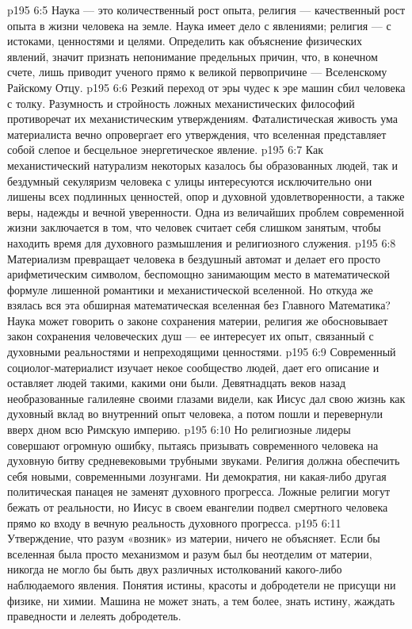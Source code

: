 \vs p195 6:5 Наука --- это количественный рост опыта, религия --- качественный рост опыта в жизни человека на земле. Наука имеет дело с явлениями; религия --- с истоками, ценностями и целями. Определить  как объяснение физических явлений, значит признать непонимание предельных причин, что, в конечном счете, лишь приводит ученого прямо к великой первопричине --- Вселенскому Райскому Отцу.
\vs p195 6:6 Резкий переход от эры чудес к эре машин сбил человека с толку. Разумность и стройность ложных механистических философий противоречат их механистическим утверждениям. Фаталистическая живость ума материалиста вечно опровергает его утверждения, что вселенная представляет собой слепое и бесцельное энергетическое явление.
\vs p195 6:7 Как механистический натурализм некоторых казалось бы образованных людей, так и бездумный секуляризм человека с улицы интересуются исключительно  они лишены всех подлинных ценностей, опор и духовной удовлетворенности, а также веры, надежды и вечной уверенности. Одна из величайших проблем современной жизни заключается в том, что человек считает себя слишком занятым, чтобы находить время для духовного размышления и религиозного служения.
\vs p195 6:8 Материализм превращает человека в бездушный автомат и делает его просто арифметическим символом, беспомощно занимающим место в математической формуле лишенной романтики и механистической вселенной. Но откуда же взялась вся эта обширная математическая вселенная без Главного Математика? Наука может говорить о законе сохранения материи, религия же обосновывает закон сохранения человеческих душ --- ее интересует их опыт, связанный с духовными реальностями и непреходящими ценностями.
\vs p195 6:9 Современный социолог\hyp{}материалист изучает некое сообщество людей, дает его описание и оставляет людей такими, какими они были. Девятнадцать веков назад необразованные галилеяне своими глазами видели, как Иисус дал свою жизнь как духовный вклад во внутренний опыт человека, а потом пошли и перевернули вверх дном всю Римскую империю.
\vs p195 6:10 Но религиозные лидеры совершают огромную ошибку, пытаясь призывать современного человека на духовную битву средневековыми трубными звуками. Религия должна обеспечить себя новыми, современными лозунгами. Ни демократия, ни какая\hyp{}либо другая политическая панацея не заменят духовного прогресса. Ложные религии могут бежать от реальности, но Иисус в своем евангелии подвел смертного человека прямо ко входу в вечную реальность духовного прогресса.
\vs p195 6:11 Утверждение, что разум «возник» из материи, ничего не объясняет. Если бы вселенная была просто механизмом и разум был бы неотделим от материи, никогда не могло бы быть двух различных истолкований какого\hyp{}либо наблюдаемого явления. Понятия истины, красоты и добродетели не присущи ни физике, ни химии. Машина не может знать, а тем более, знать истину, жаждать праведности и лелеять добродетель.
